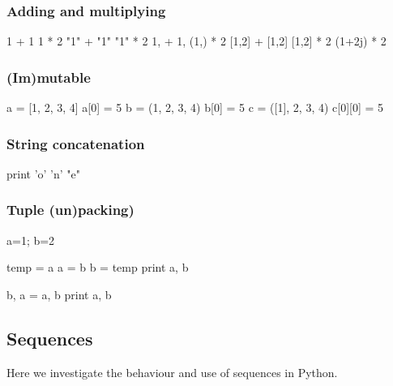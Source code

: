 \documentclass[draft=false]{article}
\begin{document}
\begin{multicols}{2}

\subsubsection{Adding and multiplying}

\begin{python}
1 + 1
1 * 2
"1" + "1"
"1" * 2
1, + 1,
(1,) * 2
[1,2] + [1,2]
[1,2] * 2
(1+2j) * 2
\end{python}

\subsubsection{(Im)mutable}

\begin{python}
a = [1, 2, 3, 4]
a[0] = 5
b = (1, 2, 3, 4)
b[0] = 5
c = ([1], 2, 3, 4)
c[0][0] = 5
\end{python}

\columnbreak

\subsubsection{String concatenation}
\begin{python}
print 'o' 'n' "e"
\end{python}

\subsubsection{Tuple (un)packing)}

\begin{python}
a=1; b=2

temp = a
a = b
b = temp
print a, b

b, a = a, b
print a, b
\end{python}

\end{multicols}

\pagebreak

\subsection{Sequences}

Here we investigate the behaviour and use of sequences in Python.
\end{document}
